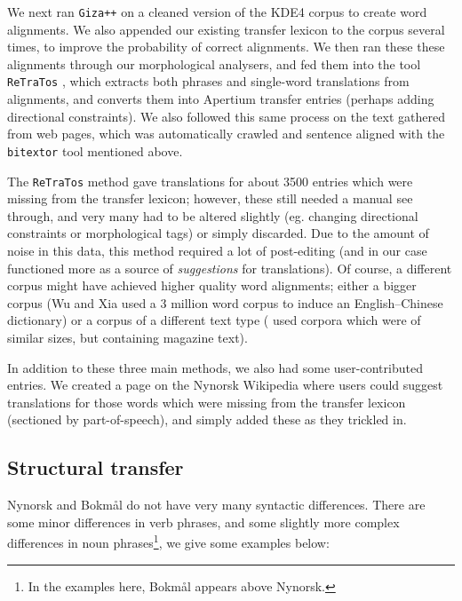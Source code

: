 \documentclass[11pt]{article}
\begin{document}
We next ran {\tt Giza++} \citep{och2003scv} on a cleaned version of the KDE4
corpus to create word alignments. We also appended our existing
transfer lexicon to the corpus several times, to improve the
probability of correct alignments. We then ran these these alignments
through our morphological analysers, and fed them into the tool
{\tt ReTraTos} \citep{caseli2006aib}, which extracts both phrases and
single-word translations from alignments, and converts them into
Apertium transfer entries (perhaps adding directional constraints). We
also followed this same process on the text gathered from web pages,
which was automatically crawled and sentence aligned with the {\tt bitextor}
tool mentioned above.

The {\tt ReTraTos} method gave translations for about 3500 entries
which were missing from the transfer lexicon; however, these still
needed a manual see through, and very many had to be altered slightly
(eg.  changing directional constraints or morphological tags) or
simply discarded. Due to the amount of noise in this data, this method
required a lot of post-editing (and in our case functioned more as a
source of \emph{suggestions} for translations). Of course, a different
corpus might have achieved higher quality word alignments; either a
bigger corpus (Wu and Xia \citep[1994, in][p.~230]{caseli2006aib} used
a 3 million word corpus to induce an English–Chinese dictionary) or a
corpus of a different text type (\citet{caseli2006aib} used corpora
which were of similar sizes, but containing magazine text).

In addition to these three main methods, we also had some
user-contributed entries. We created a page on the Nynorsk Wikipedia
where users could suggest translations for those words which were
missing from the transfer lexicon (sectioned by part-of-speech), and
simply added these as they trickled in.


\subsection{Structural transfer}
\label{sec:structural-transfer}
Nynorsk and Bokmål do not have very many syntactic differences. There
are some minor differences in verb phrases, and some slightly more
complex differences in noun phrases\footnote{In the examples here,
  Bokmål appears above Nynorsk.}, we give some examples below:
\end{document}
